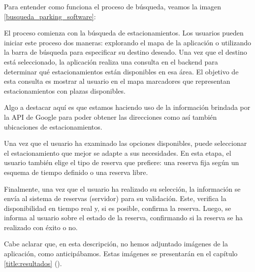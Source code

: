 Para entender como funciona el proceso de búsqueda, veamos la imagen \ref{busqueda_parking_software}: 


El proceso comienza con la búsqueda de estacionamientos. Los usuarios pueden iniciar este proceso dos maneras: explorando el mapa de la aplicación o utilizando la barra de búsqueda para especificar su destino deseado. Una vez que el destino está seleccionado, la aplicación realiza una consulta en el backend para determinar qué estacionamientos están disponibles en esa área. El objetivo de esta consulta es mostrar al usuario en el mapa marcadores que representan estacionamientos con plazas disponibles.

Algo a destacar aquí es que estamos haciendo uso de la información brindada por la API de Google para poder obtener las direcciones como así también ubicaciones de estacionamientos.

Una vez que el usuario ha examinado las opciones disponibles, puede seleccionar el estacionamiento que mejor se adapte a sus necesidades. En esta etapa, el usuario también elige el tipo de reserva que prefiere: una reserva fija según un esquema de tiempo definido o una reserva libre.

Finalmente, una vez que el usuario ha realizado su selección, la información se envía al sistema de reservas (servidor) para su validación. Este, verifica la disponibilidad en tiempo real y, si es posible, confirma la reserva. Luego, se informa al usuario sobre el estado de la reserva, confirmando si la reserva se ha realizado con éxito o no.

Cabe aclarar que, en esta descripción, no hemos adjuntado imágenes de la aplicación, como anticipábamos. Estas imágenes se presentarán en el capítulo \ref{title:resultados} ().
